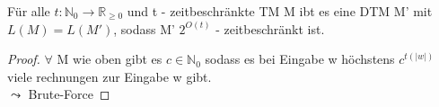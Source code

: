     Für alle \(t:\mathbb{N}_0 \to \mathbb{R}_{\geq 0}\) und t - zeitbeschränkte TM M ibt es eine DTM M' mit \(L(M) = L(M')\), sodass M' \(2^{O(t)}\) - zeitbeschränkt ist.
    \begin{proof}
        \(\forall\) M wie oben gibt es \(c \in \mathbb{N}_0\) sodass es bei Eingabe w höchstens \(c^{t(|w|)}\) viele rechnungen zur Eingabe w gibt. \\
        \(\leadsto\) Brute-Force
    \end{proof}